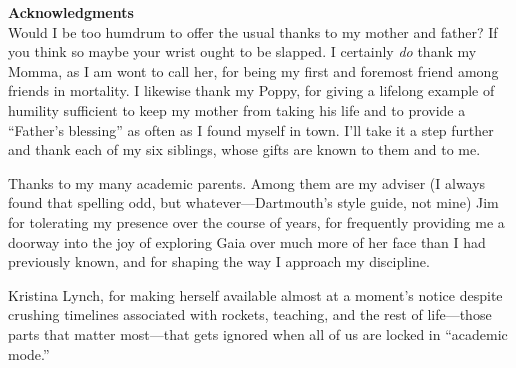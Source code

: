 
{\Huge \bf Acknowledgments} \\

Would I be too humdrum to offer the usual thanks to my mother and father? If you
think so maybe your wrist ought to be slapped. I certainly \emph{do} thank my
Momma, as I am wont to call her, for being my first and foremost friend among
friends in mortality. I likewise thank my Poppy, for giving a lifelong example
of humility sufficient to keep my mother from taking his life and to provide a
``Father's blessing'' as often as I found myself in town. I'll take it a step
further and thank each of my six siblings, whose gifts are known to them and to
me.

Thanks to my many academic parents. Among them are my adviser (I always found
that spelling odd, but whatever---Dartmouth's style guide, not mine) Jim for
tolerating my presence over the course of years, for frequently providing me a
doorway into the joy of exploring Gaia over much more of her face than I had
previously known, and for shaping the way I approach my discipline. 

Kristina Lynch, for making herself available almost at a moment's notice despite
crushing timelines associated with rockets, teaching, and the rest of
life---those parts that matter most---that gets ignored when all of us are
locked in ``academic mode.''

